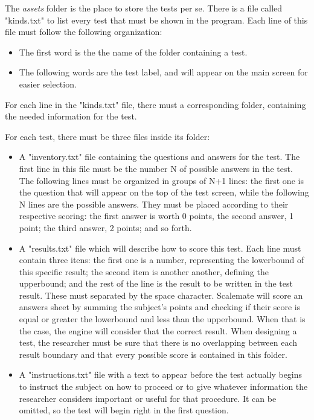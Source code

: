 \documentclass[12pt, a4paper, twoside]{article}
\begin{document}
The \textit{assets} folder is the place to store the tests per se. There is a file called "kinds.txt" to list every test that must be shown in the program. Each line of this file must follow the following organization:
\begin{itemize}
\item The first word is the the name of the folder containing a test.
\item The following words are the test label, and will appear on the main screen for easier selection.
\end{itemize}
For each line in the "kinds.txt" file, there must a corresponding folder, containing the needed information for the test.

For each test, there must be three files inside its folder:

\begin{itemize}
\item A "inventory.txt" file containing the questions and answers for the test. The first line in this file must be the number N of possible answers in the test. The following lines must be organized in groups of N+1 lines: the first one is the question that will appear on the top of the test screen, while the following N lines are the possible answers. They must be placed according to their respective scoring: the first answer is worth 0 points, the second answer, 1 point; the third answer, 2 points; and so forth.
\item A "results.txt" file which will describe how to score this test. Each line must contain three itens: the first one is a number, representing the lowerbound of this specific result; the second item is another another, defining the upperbound; and the rest of the line is the result to be written in the test result. These must separated by the space character. Scalemate will score an answers sheet by summing the subject's points and checking if their score is equal or greater the lowerbound and less than the upperbound. When that is the case, the engine will consider that the correct result. When designing a test, the researcher must be sure that there is no overlapping between each result boundary and that every possible score is contained in this folder.
\item A "instructions.txt" file with a text to appear before the test actually begins to instruct the subject on how to proceed or to give whatever information the researcher considers important or useful for that procedure. It can be omitted, so the test will begin right in the first question.
\end{itemize}
\end{document}

